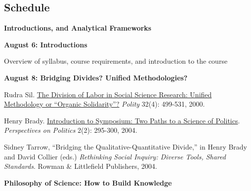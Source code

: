 \documentclass[letterpaper]{article}
\renewenvironment{itemize}{
  \begin{list}{}{
    \setlength{\leftmargin}{1.5em}
  }
}{
  \end{list}
}
\begin{document}
\subsection*{Schedule}

\begin{enumerate}

\item {\bf Introductions, and Analytical Frameworks}
	\begin{itemize}
		\item {\bf August 6: Introductions}
			\begin{itemize}
				\item[$\bullet$] Overview of syllabus, course requirements, and introduction to the course
			\end{itemize}

		\item {\bf August 8: Bridging Divides? Unified Methodologies?}
		\begin{itemize}
			\item[$\bullet$] Rudra Sil. \href{https://www.journals.uchicago.edu/doi/abs/10.2307/3235291}{The Division of Labor in Social Science Research: Unified Methodology or ``Organic Solidarity''?} \emph{Polity} 32(4): 499-531, 2000.
			\item[$\bullet$] Henry Brady. \href{http://www.jstor.org/stable/3688441}{Introduction to Symposium: Two Paths to a Science of Politics}. \emph{Perspectives on Politics} 2(2): 295-300, 2004.
			\item[$\bullet$] Sidney Tarrow, ``Bridging the Qualitative-Quantitative Divide,'' in  Henry Brady and David Collier (eds.) \emph{Rethinking Social Inquiry: Diverse Tools, Shared Standards}. Rowman \& Littlefield Publishers, 2004.
		\end{itemize}
	\end{itemize}

\item {\bf Philosophy of Science: How to Build Knowledge}



\end{enumerate}
\end{document}

